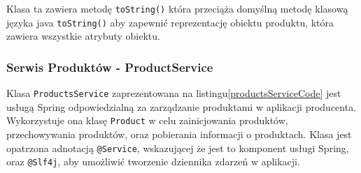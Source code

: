 Klasa ta zawiera metodę \verb|toString()| która przeciąża domyślną metodę klasową języka java \verb|toString()| aby zapewnić reprezentację obiektu produktu, która zawiera wszystkie atrybuty obiektu.

\subsubsection{Serwis Produktów - ProductService}

Klasa \verb|ProductsService| zaprezentowana na listingu\ref{productsServiceCode} jest usługą Spring odpowiedzialną za zarządzanie produktami w aplikacji producenta. Wykorzystuje ona klasę \verb|Product| w celu zainicjowania produktów, przechowywania produktów, oraz pobierania informacji o produktach. Klasa jest opatrzona adnotacją \verb|@Service|, wskazującej że jest to komponent usługi Spring, oraz \verb|@Slf4j|, aby umożliwić tworzenie dziennika zdarzeń w aplikacji.

